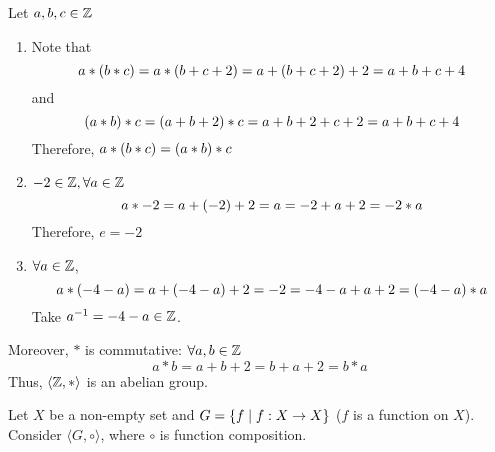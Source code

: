 \begin{solution} Let $a, b, c \in \mathbb{Z}$
    \begin{myspace}
        \begin{enumerate}[label=\textbf{(G\arabic*)}]
            \item Note that 
            \[ a \ast \qty(b \ast c) = a \ast \qty(b + c + 2) = a  + \qty(b + c + 2) + 2  = a + b + c +4 \]
            and 
            \[ \qty(a \ast b) \ast c = \qty(a + b + 2) \ast c = a + b + 2 + c + 2 = a + b + c + 4 \]
            Therefore, $a \ast \qty(b \ast c) = \qty(a \ast b) \ast c$
            \item $-2 \in \mathbb{Z}, \forall a \in \mathbb{Z}$ 
            \[ a \ast -2 = a + \qty(-2) + 2 = a = -2 + a + 2 = -2 \ast a \]
            Therefore, $e = -2$
            \item $\forall a \in \mathbb{Z}$,
            \[ a \ast \qty(-4 -a ) = a + \qty(-4 -a) + 2 = -2 = -4 -a  + a + 2 = \qty(-4-a) \ast a \]
            Take $a^{-1} = -4 - a \in \mathbb{Z}$.
        \end{enumerate}
    \end{myspace}
    Moreover, $\ast$ is commutative: $\forall a, b \in \mathbb{Z}$
    \[ a \ast b = a + b + 2 = b + a + 2 = b \ast a \]
    Thus, $\langle \mathbb{Z}, \ast \rangle$ is an abelian group.
\end{solution}

\begin{exercise}
    Let $X$ be a non-empty set and $G = \qty{f \mid f: X \to X}$ ($f$ is a function on $X$). Consider $\langle G, \circ \rangle$, where $\circ$ is function composition.
\end{exercise}

